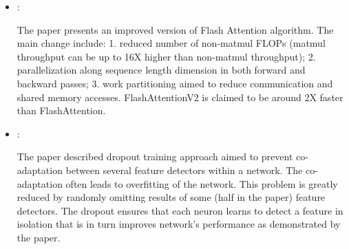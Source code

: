 \begin{itemize}
    \item \cite{Dao:FlashAttentionV2:2023}:

    The paper presents an improved version of Flash Attention algorithm. The main change include: 1. reduced number of non-matmul FLOPs (matmul throughput can be up to 16X higher than non-matmul throughput); 2. parallelization along sequence length dimension in both forward and backward passes; 3. work partitioning aimed to reduce communication and shared memory accesses. FlashAttentionV2 is claimed to be around 2X faster than FlashAttention.

    \item \cite{Hinton:Dropout:2012}:

    The paper described dropout training approach aimed to prevent co-adaptation between several feature detectors within a network. The co-adaptation often leads to overfitting of the network. This problem is greatly reduced by randomly omitting results of some (half in the paper) feature detectors. The dropout ensures that each neuron learns to detect a feature in isolation that is in turn improves network's performance as demonstrated by the paper.
\end{itemize}

